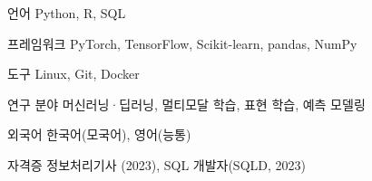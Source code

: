 \documentclass[11pt, a4paper]{awesome-cv}
\let\origcvsection\cvsection
\renewcommand{\cvsection}[1]{\needspace{7\baselineskip}\origcvsection{#1}}
\let\origcvsubsection\cvsubsection
\renewcommand{\cvsubsection}[1]{\needspace{5\baselineskip}\origcvsubsection{#1}}
\begin{document}
\vspace{1mm}

\begin{cvskills}

  \cvskill
    {언어}
    {Python, R, SQL}

  \cvskill
    {프레임워크}
    {PyTorch, TensorFlow, Scikit-learn, pandas, NumPy}

  \cvskill
    {도구}
    {Linux, Git, Docker}

  \cvskill
    {연구 분야}
    {머신러닝·딥러닝, 멀티모달 학습, 표현 학습, 예측 모델링}

  \cvskill
    {외국어}
    {한국어(모국어), 영어(능통)}

  \cvskill
    {자격증}
    {정보처리기사 (2023), SQL 개발자(SQLD, 2023)}

\end{cvskills}

\vspace{1mm}

\end{document}
